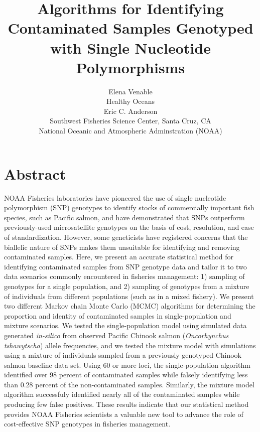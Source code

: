 \documentclass[12pt]{article}
\begin{document}
\normalem

\setlength{\parindent}{0cm}
\title{\textbf{Algorithms for Identifying Contaminated Samples Genotyped with Single Nucleotide Polymorphisms}}
\author{\Large Elena Venable\\ 
	Healthy Oceans\\
	Eric C. Anderson\\
	Southwest Fisheries Science Center, Santa Cruz, CA\\
	National Oceanic and Atmospheric Adminstration (NOAA)
  \date{}}
\maketitle

\section*{Abstract} 
NOAA Fisheries laboratories have pioneered the use of single nucleotide polymorphism (SNP) genotypes to identify stocks of commercially
important fish species, such as Pacific salmon, and have demonstrated that SNPs outperform previously-used microsatellite genotypes on the
basis of cost, resolution, and ease of standardization. However, some geneticists have registered concerns that the biallelic nature of SNPs makes them unsuitable for identifying and removing contaminated samples. Here, we
present an accurate statistical method for identifying contaminated samples from SNP genotype data and tailor it to two data scenarios
commonly encountered in fisheries management: 1) sampling of genotypes for a single population, and 2) sampling of genotypes from a mixture
of individuals from different populations (such as in a mixed fishery). We present two different Markov chain Monte Carlo (MCMC) algorithms
for determining the proportion and identity of contaminated samples in single-population and mixture scenarios. We tested the 
single-population model using simulated data generated {\em in-silico} from observed Pacific Chinook salmon
(\textit{Oncorhynchus tshawytscha}) allele frequencies, and we tested the mixture model with simulations using a mixture of individuals
sampled from a previously genotyped Chinook salmon baseline data set. Using 60 or more loci, the single-population algorithm identified over
98 percent of contaminated samples while falsely identifying less than 0.28 percent of the non-contaminated samples.  Similarly, the mixture
model algorithm successfuly identified nearly all of the contaminated samples while producing few false positives. These results indicate
that our statistical method provides NOAA Fisheries scientists a valuable new tool to advance the role of cost-effective SNP genotypes in
fisheries management.
\end{document}
